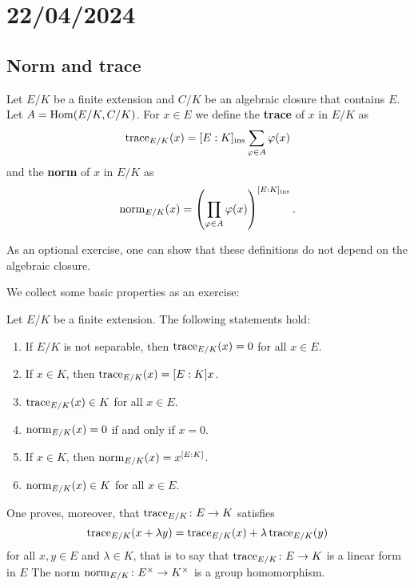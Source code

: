 \section{22/04/2024}

\subsection{Norm and trace}

\begin{definition}
    Let $E/K$ be a finite extension and $C/K$ be an algebraic closure 
    that contains $E$. Let $A=\operatorname{Hom}(E/K,C/K)$. For $x\in E$
    we define the \textbf{trace} of $x$ in $E/K$ 
    as 
    \[
    \operatorname{trace}_{E/K}(x)=[E:K]_{\operatorname{ins}}\sum_{\varphi\in A}\varphi(x)
    \]
    and the \textbf{norm} of $x$ in $E/K$ as
    \[
    \operatorname{norm}_{E/K}(x)=\left(\prod_{\varphi\in A}\varphi(x)\right)^{[E:K]_{\operatorname{ins}}}.
    \]
\end{definition}

As an optional exercise, one can show that these definitions do not depend on the algebraic closure. 

We collect some basic properties as an exercise:

\begin{exercise}
\label{xca:norm_and_trace}
    Let $E/K$ be a finite extension. The following statements hold:
    \begin{enumerate}
        \item If $E/K$ is not separable, then $\operatorname{trace}_{E/K}(x)=0$ for all $x\in E$.
        \item If $x\in K$, then $\operatorname{trace}_{E/K}(x)=[E:K]x$.
        \item $\operatorname{trace}_{E/K}(x)\in K$ for all $x\in E$.
        \item $\operatorname{norm}_{E/K}(x)=0$ if and only if $x=0$. 
        \item If $x\in K$, then $\operatorname{norm}_{E/K}(x)=x^{[E:K]}$. 
        \item $\operatorname{norm}_{E/K}(x)\in K$ for all $x\in E$. 
    \end{enumerate}
\end{exercise}

One proves, moreover, that  
$\operatorname{trace}_{E/K}\colon E\to K$ 
satisfies
\[
\operatorname{trace}_{E/K}(x+\lambda y)=
\operatorname{trace}_{E/K}(x)+\lambda\operatorname{trace}_{E/K}(y)
\]
for all $x,y\in E$ and $\lambda\in K$, that is to say that 
$\operatorname{trace}_{E/K}\colon E\to K$ 
is a 
linear form in $E$ The norm  
$\operatorname{norm}_{E/K}\colon E^{\times}\to K^{\times}$ 
is a group homomorphism. 

